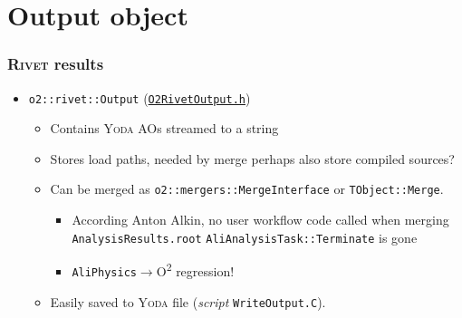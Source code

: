 \documentclass[compress,table,8pt]{beamer}
\newcommand\Rivet{{\scshape Rivet}}
\newcommand\Yoda{{\scshape Yoda}}
\newcommand\Otwo{O\textsuperscript{2}}
\begin{document}
\section{Output object}
\begin{frame}
  \frametitle{\Rivet{} results}
  \begin{itemize}
  \item<+-> \texttt{o2::rivet::Output}
    (\href{https://gitlab.com/cholmcc/O2Rivet/-/blob/master/O2RivetOutput.h}{\texttt{O2RivetOutput.h}})
    \begin{itemize}
    \item<+-> Contains \Yoda{} AOs streamed to a string
    \item<+-> Stores load paths, needed by merge\newline%
      {\footnotesize perhaps also store compiled sources?}
    \item<+-> Can be merged as
      \texttt{o2::mergers::MergeInterface} or \texttt{TObject::Merge}.
      \begin{itemize}
      \item<+-> According Anton Alkin, no user workflow code called
        when merging \texttt{AnalysisResults.root}\newline%
        {\footnotesize \texttt{AliAnalysisTask::Terminate} is gone}
      \item<+-> \texttt{AliPhysics}$\rightarrow$\Otwo{} regression!
      \end{itemize}
    \item<+-> Easily saved to \Yoda{} file (\emph{script}
      \texttt{WriteOutput.C}).
    \end{itemize}
  \end{itemize}
\end{frame}

\end{document}
